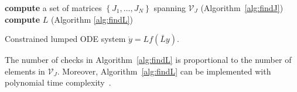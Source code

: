 {\begin{minipage}[t]{0.47\textwidth}
\begin{algorithm}[H]
\begin{algorithmic}[1]

				\STATE \textbf{compute} a set of matrices $\left\{ J_1,\dots,J_N \right\}$ spanning $\mathcal{V}_{J}$ (Algorithm~\ref{alg:findJ})\\
				\STATE \textbf{compute} $L$ (Algorithm \ref{alg:findL}) \label{alg:clue:findL}

				\RETURN Constrained lumped ODE system $\dot{y} = L f (\bar{L}y)$.

			\end{algorithmic}
		\end{algorithm}
		\vspace{0.01cm}
	\end{minipage}


	The number of checks in Algorithm~\ref{alg:findL} is proportional to the number of elements in $\mathcal{V}_{J}$.
	Moreover, Algorithm~\ref{alg:findL} can be implemented with polynomial time complexity~\cite{ovchinnikov_clue_2021,jimenez_clue_2022}.

}


